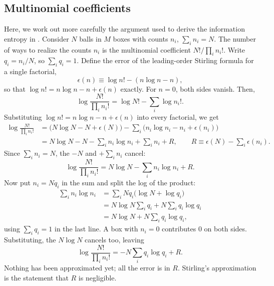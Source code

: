 \subsection{Multinomial coefficients}
Here, we work out more carefully the argument used to derive the information
entropy in .
Consider $N$ balls in $M$ boxes with counts $n_i$, $\sum_i n_i=N$. The number of
ways to realize the counts $n_i$ is the multinomial
coefficient $N!/\prod_i n_i!$. Write
$q_i=n_i/N$, so $\sum_i q_i=1$. Define the error of the leading-order Stirling
formula for a single factorial,
\begin{equation}
  \epsilon(n) \equiv \log n! - (n\log n - n),
\end{equation}
so that $\log n! = n\log n - n + \epsilon(n)$ exactly. For $n=0$, 
both sides vanish. Then, 
\begin{equation}
  \log\frac{N!}{\prod_i n_i!} = \log N! - \sum_i \log n_i! .
\end{equation}
Substituting $\log n!=n\log n-n+\epsilon(n)$ into every factorial, we get
\begin{align}
  \log\frac{N!}{\prod_i n_i!}
  &= \bigl(N\log N - N + \epsilon(N)\bigr)
     - \sum_i\bigl(n_i\log n_i - n_i + \epsilon(n_i)\bigr) \\
  &= N\log N - N - \sum_i n_i\log n_i + \sum_i n_i + R ,
  \qquad R \equiv \epsilon(N) - \sum_i\epsilon(n_i) .\nonumber
\end{align}
Since $\sum_i n_i=N$, the $-N$ and $+\sum_i n_i$ cancel:
\begin{equation}
  \log\frac{N!}{\prod_i n_i!} = N\log N - \sum_i n_i\log n_i + R .
\end{equation}
Now put $n_i=Nq_i$ in the sum and split the log of the product:
\begin{align}
  \sum_i n_i\log n_i
  &= \sum_i Nq_i\bigl(\log N + \log q_i\bigr) \\
  &= N\log N\sum_i q_i + N\sum_i q_i\log q_i \nonumber\\
  &= N\log N + N\sum_i q_i\log q_i ,\nonumber
\end{align}
using $\sum_i q_i=1$ in the last line. A box with $n_i=0$ contributes $0$ on
both sides. Substituting, the $N\log N$ cancels too, leaving
\begin{equation}\label{eq:multinomialStirling}
  \log\frac{N!}{\prod_i n_i!} = -N\sum_i q_i\log q_i + R .
\end{equation}
Nothing has been approximated yet; all the error is in $R$. Stirling's
approximation is the statement that $R$ is negligible.

